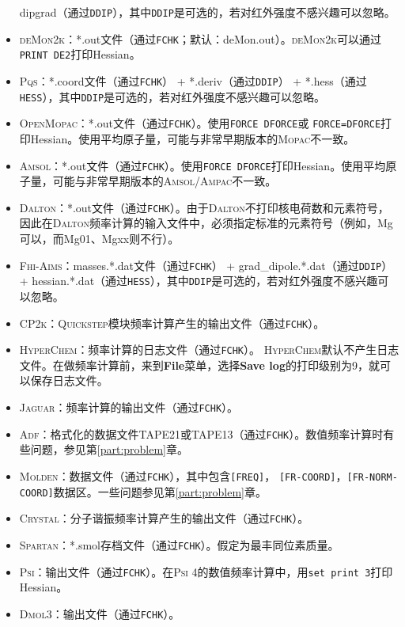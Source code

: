\documentclass[12pt,a4paper,openany,twoside,cap,UTF8]{ctexbook}
\begin{document}
\begin{itemize}
dipgrad（通过\verb|DDIP|），其中\verb|DDIP|是可选的，若对红外强度不感兴趣可以忽略。
\item \textsc{deMon2k}：*.out文件（通过\verb|FCHK|；默认：deMon.out）。\textsc{deMon2k}可以通过\texttt{PRINT DE2}打印Hessian。
\item \textsc{Pqs}：*.coord文件（通过\verb|FCHK|） + *.deriv（通过\verb|DDIP|） + *.hess（通过\verb|HESS|），其中\verb|DDIP|是可选的，若对红外强度不感兴趣可以忽略。
\item \textsc{OpenMopac}：*.out文件（通过\verb|FCHK|）。使用\texttt{FORCE DFORCE}或
\texttt{FORCE=DFORCE}打印Hessian。使用平均原子量，可能与非常早期版本的\textsc{Mopac}不一致。
\item \textsc{Amsol}：*.out文件（通过\verb|FCHK|）。使用\texttt{FORCE DFORCE}打印Hessian。使用平均原子量，可能与非常早期版本的\textsc{Amsol/Ampac}不一致。
\item \textsc{Dalton}：*.out文件（通过\verb|FCHK|）。由于\textsc{Dalton}不打印核电荷数和元素符号，因此在\textsc{Dalton}频率计算的输入文件中，必须指定标准的元素符号（例如，Mg可以，而Mg01、Mgxx则不行）。
\item \textsc{Fhi-Aims}：masses.*.dat文件（通过\verb|FCHK|） + grad{\_}dipole.*.dat（通过\verb|DDIP|） + hessian.*.dat（通过\verb|HESS|），其中\verb|DDIP|是可选的，若对红外强度不感兴趣可以忽略。
\item \textsc{CP2k}：\textsc{Quickstep}模块频率计算产生的输出文件（通过\verb|FCHK|）。
\item \textsc{HyperChem}：频率计算的日志文件（通过\verb|FCHK|）。
\textsc{HyperChem}默认不产生日志文件。在做频率计算前，来到\textbf{File}菜单，选择\textbf{Save log}的打印级别为9，就可以保存日志文件。
\item \textsc{Jaguar}：频率计算的输出文件（通过\verb|FCHK|）。
\item \textsc{Adf}：格式化的数据文件TAPE21或TAPE13（通过\verb|FCHK|）。数值频率计算时有些问题，参见第\ref{part:problem}章。
\item \textsc{Molden}：数据文件（通过\verb|FCHK|），其中包含\verb|[FREQ]|，
\verb|[FR-COORD]|，\verb|[FR-NORM-COORD]|数据区。一些问题参见第\ref{part:problem}章。
\item \textsc{Crystal}：分子谐振频率计算产生的输出文件（通过\verb|FCHK|）。
\item \textsc{Spartan}：*.smol存档文件（通过\verb|FCHK|）。假定为最丰同位素质量。
\item \textsc{Psi}：输出文件（通过\verb|FCHK|）。在\textsc{Psi} 4的数值频率计算中，用\texttt{set print 3}打印Hessian。
\item \textsc{Dmol3}：输出文件（通过\verb|FCHK|）。

\end{itemize}
\end{document}
